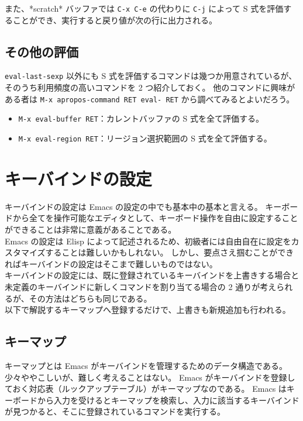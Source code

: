 また、*scratch* バッファでは \texttt{C-x C-e} の代わりに \texttt{C-j} によって S 式を評価することができ、実行すると戻り値が次の行に出力される。
\subsection{その他の評価}
\texttt{eval-last-sexp} 以外にも S 式を評価するコマンドは幾つか用意されているが、そのうち利用頻度の高いコマンドを 2 つ紹介しておく。
他のコマンドに興味がある者は \texttt{M-x apropos-command RET eval- RET} から調べてみるとよいだろう。
\begin{itemize}\setlength{\leftskip}{-1.00zw}%
\item \texttt{M-x eval-buffer RET}：カレントバッファの S 式を全て評価する。
\item \texttt{M-x eval-region RET}：リージョン選択範囲の S 式を全て評価する。
\end{itemize}
\section{キーバインドの設定}
キーバインドの設定は Emacs の設定の中でも基本中の基本と言える。
キーボードから全てを操作可能なエディタとして、キーボード操作を自由に設定することができることは非常に意義があることである。\\

Emacs の設定は Elisp によって記述されるため、初級者には自由自在に設定をカスタマイズすることは難しいかもしれない。
しかし、要点さえ掴むことができればキーバインドの設定はそこまで難しいものではない。\\

キーバインドの設定には、既に登録されているキーバインドを上書きする場合と未定義のキーバインドに新しくコマンドを割り当てる場合の 2 通りが考えられるが、その方法はどちらも同じである。\\

以下で解説するキーマップへ登録するだけで、上書きも新規追加も行われる。
\subsection{キーマップ}
キーマップとは Emacs がキーバインドを管理するためのデータ構造である。
少々ややこしいが、難しく考えることはない。
Emacs がキーバインドを登録しておく対応表（ルックアップテーブル）がキーマップなのである。
Emacs はキーボードから入力を受けるとキーマップを検索し、入力に該当するキーバインドが見つかると、そこに登録されているコマンドを実行する。\\

